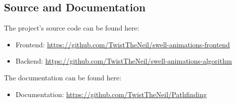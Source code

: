 \subsection{Source and Documentation} \label{App:AppendixSD}
The project's source code can be found here:\\
\begin{itemize}
    \item Frontend: \url{https://github.com/TwistTheNeil/swell-animations-frontend}
    \item Backend: \url{https://github.com/TwistTheNeil/swell-animations-algorithm}
\end{itemize}
The documentation can be found here:\\
\begin{itemize}
    \item Documentation: \url{https://github.com/TwistTheNeil/Pathfinding}
\end{itemize}
